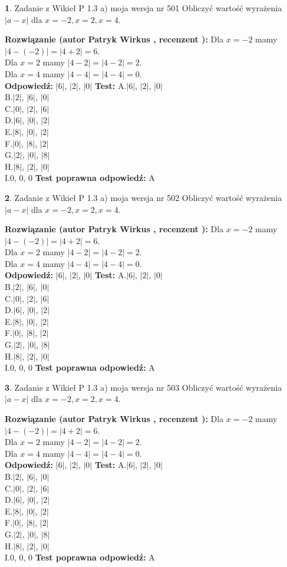 \documentclass[12pt, a4paper]{article}
\theoremstyle{definition} %
\newtheorem{zad}{}
\newcommand{\zadStart}[1]{\begin{zad}#1\newline}
\newcommand{\zadStop}{\end{zad}}
\newcommand{\rozwStart}[2]{\noindent \textbf{Rozwiązanie (autor #1 , recenzent #2): }\newline}
\newcommand{\rozwStop}{\newline}
\newcommand{\odpStart}{\noindent \textbf{Odpowiedź:}\newline}
\newcommand{\odpStop}{\newline}
\newcommand{\testStart}{\noindent \textbf{Test:}\newline}
\newcommand{\testStop}{\newline}
\newcommand{\kluczStart}{\noindent \textbf{Test poprawna odpowiedź:}\newline}
\newcommand{\kluczStop}{\newline}
\begin{document}
\zadStart{Zadanie z Wikieł P 1.3 a) moja wersja nr 501}
Obliczyć wartość wyrażenia $|a - x|$ dla $x=-2,x=2,x=4$.
\zadStop
\rozwStart{Patryk Wirkus}{}
Dla $x = -2$ mamy $|4 - (-2)| = |4 + 2| = 6$.\\
Dla $x = 2$ mamy $|4 - 2| = |4 - 2| = 2$.\\
Dla $x = 4$ mamy $|4 - 4| = |4 - 4| = 0$.\\
\rozwStop
\odpStart
$|6|$, $|2|$, $|0|$
\odpStop
\testStart
A.$|6|$, $|2|$, $|0|$\\
B.$|2|$, $|6|$, $|0|$\\
C.$|0|$, $|2|$, $|6|$\\
D.$|6|$, $|0|$, $|2|$\\
E.$|8|$, $|0|$, $|2|$\\
F.$|0|$, $|8|$, $|2|$\\
G.$|2|$, $|0|$, $|8|$\\
H.$|8|$, $|2|$, $|0|$\\
I.$0$, $0$, $0$
\testStop
\kluczStart
A
\kluczStop



\zadStart{Zadanie z Wikieł P 1.3 a) moja wersja nr 502}
Obliczyć wartość wyrażenia $|a - x|$ dla $x=-2,x=2,x=4$.
\zadStop
\rozwStart{Patryk Wirkus}{}
Dla $x = -2$ mamy $|4 - (-2)| = |4 + 2| = 6$.\\
Dla $x = 2$ mamy $|4 - 2| = |4 - 2| = 2$.\\
Dla $x = 4$ mamy $|4 - 4| = |4 - 4| = 0$.\\
\rozwStop
\odpStart
$|6|$, $|2|$, $|0|$
\odpStop
\testStart
A.$|6|$, $|2|$, $|0|$\\
B.$|2|$, $|6|$, $|0|$\\
C.$|0|$, $|2|$, $|6|$\\
D.$|6|$, $|0|$, $|2|$\\
E.$|8|$, $|0|$, $|2|$\\
F.$|0|$, $|8|$, $|2|$\\
G.$|2|$, $|0|$, $|8|$\\
H.$|8|$, $|2|$, $|0|$\\
I.$0$, $0$, $0$
\testStop
\kluczStart
A
\kluczStop



\zadStart{Zadanie z Wikieł P 1.3 a) moja wersja nr 503}
Obliczyć wartość wyrażenia $|a - x|$ dla $x=-2,x=2,x=4$.
\zadStop
\rozwStart{Patryk Wirkus}{}
Dla $x = -2$ mamy $|4 - (-2)| = |4 + 2| = 6$.\\
Dla $x = 2$ mamy $|4 - 2| = |4 - 2| = 2$.\\
Dla $x = 4$ mamy $|4 - 4| = |4 - 4| = 0$.\\
\rozwStop
\odpStart
$|6|$, $|2|$, $|0|$
\odpStop
\testStart
A.$|6|$, $|2|$, $|0|$\\
B.$|2|$, $|6|$, $|0|$\\
C.$|0|$, $|2|$, $|6|$\\
D.$|6|$, $|0|$, $|2|$\\
E.$|8|$, $|0|$, $|2|$\\
F.$|0|$, $|8|$, $|2|$\\
G.$|2|$, $|0|$, $|8|$\\
H.$|8|$, $|2|$, $|0|$\\
I.$0$, $0$, $0$
\testStop
\kluczStart
A
\kluczStop
\end{document}

